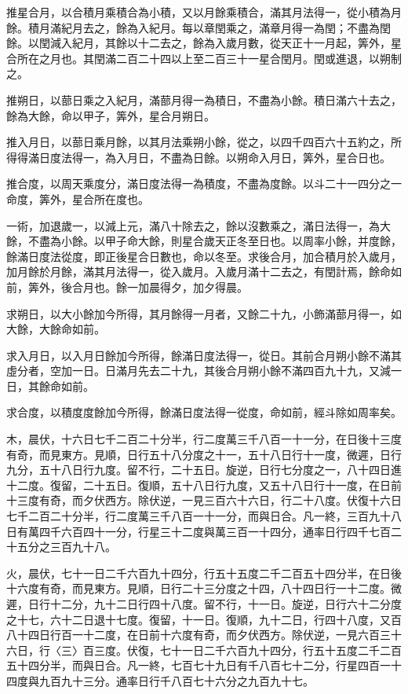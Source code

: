 \begin{pinyinscope}
推星合月，以合積月乘積合為小積，又以月餘乘積合，滿其月法得一，從小積為月餘。積月滿紀月去之，餘為入紀月。每以章閏乘之，滿章月得一為閏；不盡為閏餘。以閏減入紀月，其餘以十二去之，餘為入歲月數，從天正十一月起，筭外，星合所在之月也。其閏滿二百二十四以上至二百三十一星合閏月。閏或進退，以朔制之。

推朔日，以蔀日乘之入紀月，滿蔀月得一為積日，不盡為小餘。積日滿六十去之，餘為大餘，命以甲子，筭外，星合月朔日。

推入月日，以蔀日乘月餘，以其月法乘朔小餘，從之，以四千四百六十五約之，所得得滿日度法得一，為入月日，不盡為日餘。以朔命入月日，筭外，星合日也。

推合度，以周天乘度分，滿日度法得一為積度，不盡為度餘。以斗二十一四分之一命度，筭外，星合所在度也。

一術，加退歲一，以減上元，滿八十除去之，餘以沒數乘之，滿日法得一，為大餘，不盡為小餘。以甲子命大餘，則星合歲天正冬至日也。以周率小餘，并度餘，餘滿日度法從度，即正後星合日數也，命以冬至。求後合月，加合積月於入歲月，加月餘於月餘，滿其月法得一，從入歲月。入歲月滿十二去之，有閏計焉，餘命如前，筭外，後合月也。餘一加晨得夕，加夕得晨。

求朔日，以大小餘加今所得，其月餘得一月者，又餘二十九，小飾滿蔀月得一，如大餘，大餘命如前。

求入月日，以入月日餘加今所得，餘滿日度法得一，從日。其前合月朔小餘不滿其虛分者，空加一日。日滿月先去二十九，其後合月朔小餘不滿四百九十九，又減一日，其餘命如前。

求合度，以積度度餘加今所得，餘滿日度法得一從度，命如前，經斗除如周率矣。

木，晨伏，十六日七千二百二十分半，行二度萬三千八百一十一分，在日後十三度有奇，而見東方。見順，日行五十八分度之十一，五十八日行十一度，微遲，日行九分，五十八日行九度。留不行，二十五日。旋逆，日行七分度之一，八十四日進十二度。復留，二十五日。復順，五十八日行九度，又五十八日行十一度，在日前十三度有奇，而夕伏西方。除伏逆，一見三百六十六日，行二十八度。伏復十六日七千二百二十分半，行二度萬三千八百一十一分，而與日合。凡一終，三百九十八日有萬四千六百四十一分，行星三十二度與萬三百一十四分，通率日行四千七百二十五分之三百九十八。

火，晨伏，七十一日二千六百九十四分，行五十五度二千二百五十四分半，在日後十六度有奇，而見東方。見順，日行二十三分度之十四，八十四日行一十二度。微遲，日行十二分，九十二日行四十八度。留不行，十一日。旋逆，日行六十二分度之十七，六十二日退十七度。復留，十一日。復順，九十二日，行四十八度，又百八十四日行百一十二度，在日前十六度有奇，而夕伏西方。除伏逆，一見六百三十六日，行〈三〉百三度。伏復，七十一日二千六百九十四分，行五十五度二千二百五十四分半，而與日合。凡一終，七百七十九日有千八百七十二分，行星四百一十四度與九百九十三分。通率日行千八百七十六分之九百九十七。


\end{pinyinscope}
